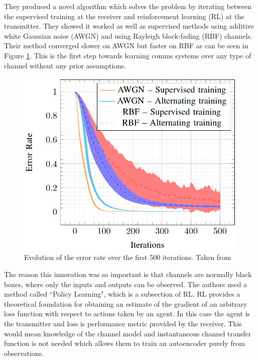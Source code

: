 \documentclass[12pt,onecolumn,letterpaper]{article}
\newcommand\genfigsize{0.5}
\begin{document}
They produced a novel algorithm which solves the problem by iterating between the supervised training at the receiver and reinforcement learning (RL) at the transmitter. They showed it worked as well as supervised methods using additive white Gaussian noise (AWGN) and using Rayleigh block-fading (RBF) channels. Their method converged slower on AWGN but faster on RBF as can be seen in Figure \ref{fig:AoudiaTrainingSpeeds}. This is the first step towards learning comms systems over any type of channel without any prior assumptions. 

\begin{figure}[t]
   \centering
   \includegraphics[width=\genfigsize\linewidth]{figures/Aoudia_relative_training_speeds.PNG}
   \caption{Evolution of the error rate over the first 500 iterations. Taken from~\cite{Aoudia}}
\label{fig:AoudiaTrainingSpeeds}
\end{figure}

The reason this innovation was so important is that channels are normally black boxes, where only the inputs and outputs can be observed. The authors used a method called ``Policy Learning", which is a subsection of RL. RL provides a theoretical foundation for obtaining an estimate of the gradient of an arbitrary loss function with respect to actions taken by an agent. In this case the agent is the transmitter and loss is performance metric provided by the receiver. This would mean knowledge of the channel model and instantaneous channel transfer function is not needed which allows them to train an autoencoder purely from observations. 
\end{document}
